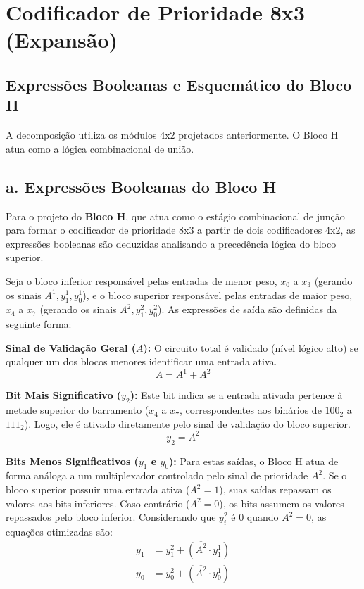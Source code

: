 \section{Codificador de Prioridade 8x3 (Expansão)}

\subsection{Expressões Booleanas e Esquemático do Bloco H}
A decomposição utiliza os módulos 4x2 projetados anteriormente. O Bloco H atua como a lógica combinacional de união.
\subsection*{a. Expressões Booleanas do Bloco H}

Para o projeto do \textbf{Bloco H}, que atua como o estágio combinacional de junção para formar o codificador de prioridade 8x3 a partir de dois codificadores 4x2, as expressões booleanas são deduzidas analisando a precedência lógica do bloco superior.

Seja o bloco inferior responsável pelas entradas de menor peso, $x_0$ a $x_3$ (gerando os sinais $A^1, y_1^1, y_0^1$), e o bloco superior responsável pelas entradas de maior peso, $x_4$ a $x_7$ (gerando os sinais $A^2, y_1^2, y_0^2$). As expressões de saída são definidas da seguinte forma:


\textbf{Sinal de Validação Geral ($A$):} O circuito total é validado (nível lógico alto) se qualquer um dos blocos menores identificar uma entrada ativa.
    \begin{equation}
        A = A^1 + A^2
    \end{equation}

\textbf{Bit Mais Significativo ($y_2$):} Este bit indica se a entrada ativada pertence à metade superior do barramento ($x_4$ a $x_7$, correspondentes aos binários de $100_2$ a $111_2$). Logo, ele é ativado diretamente pelo sinal de validação do bloco superior.
    \begin{equation}
        y_2 = A^2
    \end{equation}

\textbf{Bits Menos Significativos ($y_1$ e $y_0$):} Para estas saídas, o Bloco H atua de forma análoga a um multiplexador controlado pelo sinal de prioridade $A^2$. Se o bloco superior possuir uma entrada ativa ($A^2 = 1$), suas saídas repassam os valores aos bits inferiores. Caso contrário ($A^2 = 0$), os bits assumem os valores repassados pelo bloco inferior. Considerando que $y_i^2$ é $0$ quando $A^2 = 0$, as equações otimizadas são:
    \begin{align}
        y_1 &= y_1^2 + (\overline{A^2} \cdot y_1^1) \\
        y_0 &= y_0^2 + (\overline{A^2} \cdot y_0^1)
    \end{align}

